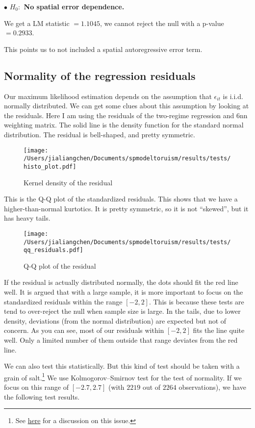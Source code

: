 \documentclass[11pt,a4paper]{amsart}
\theoremstyle{plain}
\theoremstyle{definition}
\begin{document}
$\bullet$ \textbf{$H_{0}:$ No spatial error dependence.} 

We get a LM statistic $= 1.1045$, we cannot reject the null with a  p-value $= 0.2933$. 

This points us to not included a spatial autoregressive error term.
		
\subsection{Normality of the regression residuals}\hfill\par

Our maximum likelihood estimation depends on the assumption that $\epsilon_{it}$ is i.i.d. normally distributed. We can get some clues about this assumption by looking at the residuals. Here I am using the residuals of the two-regime regression and 6nn weighting matrix. The solid line is the density function for the standard normal distribution. The residual is bell-shaped, and pretty symmetric.

\begin{figure}[hbt]
	{\centering \texttt{[image: /Users/jialiangchen/Documents/spmodeltoruism/results/tests/histo\_plot.pdf]}}
	\caption{Kernel density of the residual}\label{F:histo_resid}
\end{figure}

This is the Q-Q plot of the standardized residuals. This shows that we have a higher-than-normal kurtotics. It is pretty symmetric, so it is not ``skewed'', but it has heavy tails.
\begin{figure}[hbt]
	{\centering \texttt{[image: /Users/jialiangchen/Documents/spmodeltoruism/results/tests/qq\_residuals.pdf]}}
	\caption{Q-Q plot of the residual}\label{F:qq_residuals}
\end{figure}

If the residual is actually distributed normally, the dots should fit the red line well. It is argued that with a large sample, it is more important to focus on the standardized residuals within the range $[-2, 2]$. This is because these tests are tend to over-reject the null when  sample size is large.  In the tails, due to lower density, deviations (from the normal distribution) are expected but not of concern. As you can see, most of our residuals within $[-2, 2]$ fits the line quite well. Only a limited number of them outside that range deviates from the red line.

We can also test this statistically. But this kind of test should be taken with a grain of salt.\footnote{See \href{https://stats.stackexchange.com/questions/2492/is-normality-testing-essentially-useless}{here} for a discussion on this issue.} We use Kolmogorov–Smirnov test for the test of normality. If we focus on this range of $[-2.7, 2.7]$ (with $2219$ out of $2264$ observations), we have the following test results.
\end{document}
